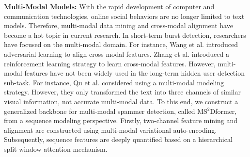 \par \textbf{Multi-Modal Models:} With the rapid development of computer and communication technologies, online social behaviors are no longer limited to text models. Therefore, multi-modal data mining and cross-modal alignment have become a hot topic in current research. In short-term burst detection, researchers have focused on the multi-modal domain. For instance, Wang et al.\cite{wang2023cross} introduced adversarial learning to align cross-modal features. Zhang et al.\cite{zhang2024reinforced} introduced a reinforcement learning strategy to learn cross-modal features. However, multi-modal features have not been widely used in the long-term hidden user detection sub-task. For instance, Qu et al.\cite{qu2024temporal} considered using a multi-modal modeling strategy. However, they only transformed the text into three channels of similar visual information, not accurate multi-modal data. To this end, we construct a generalized backbone for multi-modal spammer detection, called MS$^2$Dformer, from a sequence modeling perspective. Firstly, two-channel feature mining and alignment are constructed using multi-modal variational auto-encoding. Subsequently, sequence features are deeply quantified based on a hierarchical split-window attention mechanism.